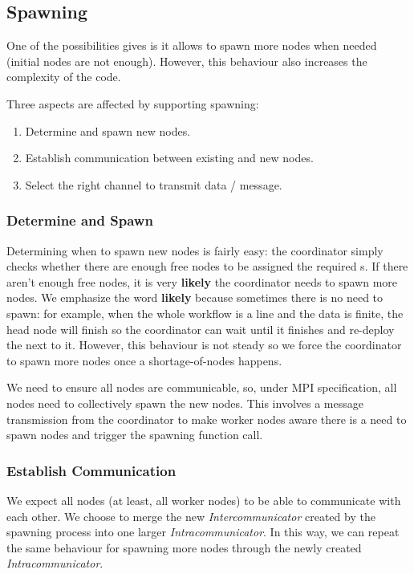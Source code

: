 \subsection{Spawning}
One of the possibilities \tincdep gives \dpy is it allows \dpy to spawn more nodes when needed (\eg initial nodes are not enough). However, this behaviour also increases the complexity of the code.

Three aspects are affected by supporting spawning:
\begin{enumerate}
	\item Determine and spawn new nodes.
	\item Establish communication between existing and new nodes.
	\item Select the right channel to transmit data / message.
\end{enumerate}

\subsubsection{Determine and Spawn}
Determining when to spawn new nodes is fairly easy: the coordinator simply checks whether there are enough free nodes to be assigned the required \tPEInst{}s. If there aren't enough free nodes, it is very \textbf{likely} the coordinator needs to spawn more nodes. We emphasize the word \textbf{likely} because sometimes there is no need to spawn: for example, when the whole workflow is a line and the data is finite, the head node will finish so the coordinator can wait until it finishes and re-deploy the next \tPEInst to it. However, this behaviour is not steady so we force the coordinator to spawn more nodes once a shortage-of-nodes happens.

We need to ensure all nodes are communicable, so, under MPI specification, all nodes need to collectively spawn the new nodes. This involves a message transmission from the coordinator to make worker nodes aware there is a need to spawn nodes and trigger the spawning function call.

\subsubsection{Establish Communication}
We expect all nodes (at least, all worker nodes) to be able to communicate with each other. We choose to merge the new \emph{Intercommunicator} created by the spawning process into one larger \emph{Intracommunicator}. In this way, we can repeat the same behaviour for spawning more nodes through the newly created \emph{Intracommunicator}.

